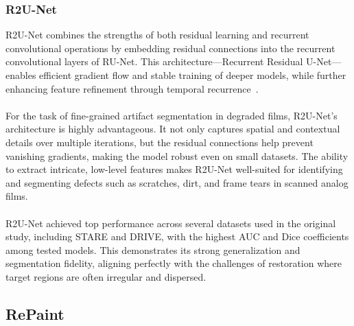 \documentclass[openany, 12pt]{article}
\begin{document}
{\subsubsection*{R2U-Net} R2U-Net combines the strengths of both residual learning and recurrent convolutional operations by embedding residual connections into the recurrent convolutional layers of RU-Net. This architecture—Recurrent Residual U-Net—enables efficient gradient flow and stable training of deeper models, while further enhancing feature refinement through temporal recurrence~\cite{alom_recurrent_2018}.\\
\\
For the task of fine-grained artifact segmentation in degraded films, R2U-Net's architecture is highly advantageous. It not only captures spatial and contextual details over multiple iterations, but the residual connections help prevent vanishing gradients, making the model robust even on small datasets. The ability to extract intricate, low-level features makes R2U-Net well-suited for identifying and segmenting defects such as scratches, dirt, and frame tears in scanned analog films.\\
\\
R2U-Net achieved top performance across several datasets used in the original study, including STARE and DRIVE, with the highest AUC and Dice coefficients among tested models. This demonstrates its strong generalization and segmentation fidelity, aligning perfectly with the challenges of restoration where target regions are often irregular and dispersed.
	\subsection{RePaint}
	
}
\end{document}
